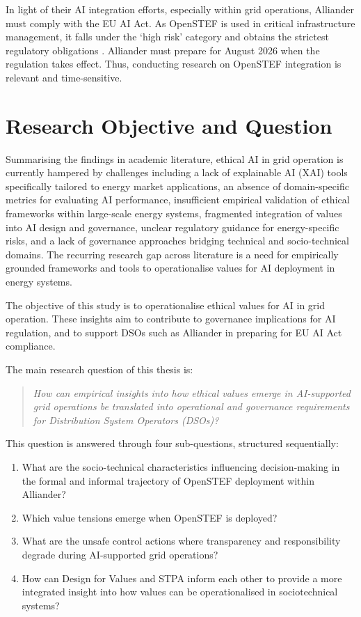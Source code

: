 In light of their AI integration efforts, especially within grid operations, Alliander must comply with the EU AI Act. As OpenSTEF is used in critical infrastructure management, it falls under the `high risk' category and obtains the strictest regulatory obligations \autocite{Article71EU}. Alliander must prepare for August 2026 when the regulation takes effect. Thus, conducting research on OpenSTEF integration is relevant and time-sensitive.

\section{Research Objective and Question}
\label{sec:researchquestion}

Summarising the findings in academic literature, ethical AI in grid operation is currently hampered by challenges including a lack of explainable AI (XAI) tools specifically tailored to energy market applications, an absence of domain-specific metrics for evaluating AI performance, insufficient empirical validation of ethical frameworks within large-scale energy systems, fragmented integration of values into AI design and governance, unclear regulatory guidance for energy-specific risks, and a lack of governance approaches bridging technical and socio-technical domains. The recurring research gap across literature is a need for empirically grounded frameworks and tools to operationalise values for AI deployment in energy systems.

The objective of this study is to operationalise ethical values for AI in grid operation. These insights aim to contribute to governance implications for AI regulation, and to support DSOs such as Alliander in preparing for EU AI Act compliance.

The main research question of this thesis is:

\begin{quote}
\textit{How can empirical insights into how ethical values emerge in AI-supported grid operations be translated into operational and governance requirements for Distribution System Operators (DSOs)?}
\end{quote}

This question is answered through four sub-questions, structured sequentially:

\begin{enumerate}
    \item What are the socio-technical characteristics influencing decision-making in the formal and informal trajectory of OpenSTEF deployment within Alliander?
    \item Which value tensions emerge when OpenSTEF is deployed?
    \item What are the unsafe control actions where transparency and responsibility degrade during AI-supported grid operations?
    \item How can Design for Values and STPA inform each other to provide a more integrated insight into how values can be operationalised in sociotechnical systems?
\end{enumerate}


